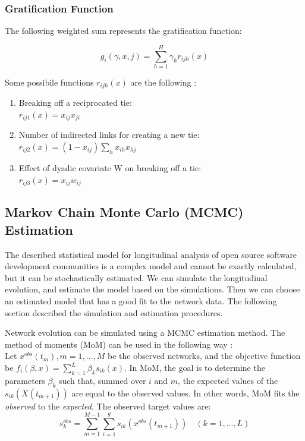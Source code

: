 \documentclass[11pt]{report}
\begin{document}
\subsubsection{Gratification Function}
The following weighted sum represents the gratification function:

\begin{equation}
g_i(\gamma, x, j) = \sum_{h = 1}^{H} \gamma_h r_{ijh}(x)
\end{equation}

Some possibile functions $r_{ijh}(x)$ are the following \cite{Snijders2004}:
\begin{enumerate}
\item Breaking off a reciprocated tie:\\ 
$r_{ij1}(x) = x_{ij} x_{ji}$
\item Number of indirected links for creating a new tie:\\ $r_{ij2}(x) = (1 - x_{ij}) \sum_h x_{ih} x_{hj}$
\item Effect of dyadic covariate W on breaking off a tie:\\
$r_{ij3}(x) = x_{ij}w_{ij}$
\end{enumerate}

\subsection{Markov Chain Monte Carlo (MCMC) Estimation}
\label{estimation}
The described statistical model for longitudinal analysis of open source software development communities is a complex model and cannot be exactly calculated, but it can be stochastically estimated. We can simulate the longitudinal evolution, and estimate the model based on the simulations. Then we can choose an estimated model that has a good fit to the network data.
The following section described the simulation and estimation procedures. 


Network evolution can be simulated using a MCMC estimation method. The method of moments (MoM) can be used in the following way \cite{Snijders2004}: \\

Let $x^{obs}(t_m), m = 1, ..., M$ be the observed networks, and the objective function be $f_i(\beta, x) = \sum_{k=1}^L \beta_k s_{ik}(x)$. 
In MoM, the goal is to determine the parameters $\beta_k$ such that, summed over $i$ and $m$, the expected values of the $s_{ik}(X(t_{m+1}))$ are equal to the observed values. In other words, MoM fits the \textit{observed} to the \textit{expected}. 
The observed target values are:
\begin{equation}
s_k^{obs} = \sum_{m=1}^{M-1}\sum_{i=1}^g s_{ik}(x^{obs}(t_{m+1})) \quad (k = 1, ..., L)
\end{equation}
\end{document}
